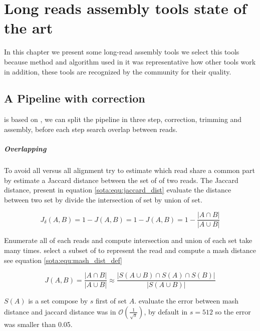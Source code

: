 \documentclass[main]{subfiles}
\begin{document}
\chapter{Long reads assembly tools state of the art}\label{chapter:sota}

In this chapter we present some long-read assembly tools we select this tools because method and algorithm used in it was representative how other tools work in addition, these tools are recognized by the community for their quality. 
\section{A Pipeline with correction \canu} \label{section:sota:canu}

\canu is based on  \cite{celera_first, celera_second}, we can split the \canu pipeline in three step, correction, trimming and assembly, before each step \canu search overlap between reads.

\paragraph{Overlapping}

To avoid all versus all alignment \mhap try to estimate which read share a common part by estimate a Jaccard distance between the set of \kmers of two reads. The Jaccard distance, present in equation \ref{sota:equ:jaccard_dist} evaluate the distance between two set by divide the intersection of set by union of set.

\begin{equation}
J_{\delta}(A,B) = 1 - J(A,B) = 1 -  J(A,B) = 1 - \frac{|A \cap B|}{|A \cup B|}
\label{sota:equ:jaccard_dist}
\end{equation}

Enumerate all \kmers of each reads and compute intersection and union of each set take many times. \mhap select a subset of \kmers to represent the read and compute a mash distance \cite{mash_distance} see equation \ref{sota:equ:mash_dist_def} 

\begin{equation}
J(A,B) = \frac{|A \cap B|}{|A \cup B|} \approx \frac{|S(A \cup B) \cap S(A) \cap S(B)|}{|S(A \cup B)|}
\label{sota:equ:mash_dist_def}
\end{equation}

$S(A)$ is a \kmers set compose by $s$ first \kmers of set $A$. \citeauthor{mash_distance} evaluate the error between mash distance and jaccard distance was in $\mathcal{O}(\frac{1}{\sqrt{s}})$, by default in \mhap $s=512$ so the error was smaller than 0.05.
\end{document}
